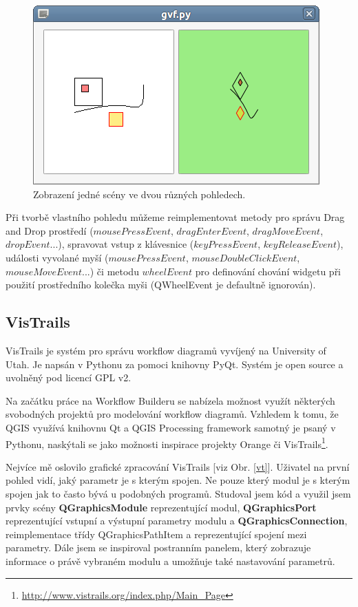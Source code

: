 \begin{figure}[h]
	\centering
	\includegraphics[scale=0.7]{pictures/qt/gsf}
	\caption{Zobrazení jedné scény ve dvou různých pohledech.}
	\label{gsf}
\end{figure}

Při tvorbě vlastního pohledu můžeme reimplementovat metody pro správu
Drag and Drop prostředí ($mousePressEvent$, $dragEnterEvent$,
$dragMoveEvent$, $dropEvent$...), spravovat vstup z klávesnice
($keyPressEvent$, $keyReleaseEvent$), události vyvolané myší
($mousePressEvent$, $mouseDoubleClickEvent$, $mouseMoveEvent$...) či
metodu $wheelEvent$ pro definování chování widgetu při použití
prostředního kolečka myši (QWheelEvent je defaultně ignorován).

\subsection{VisTrails}

VisTrails je systém pro správu workflow diagramů vyvíjený na
University of Utah. Je napsán v Pythonu za pomoci knihovny
PyQt. Systém je open source a uvolněný pod licencí GPL v2.

Na začátku práce na Workflow Builderu se nabízela možnost využít
některých svobodných projektů pro modelování workflow
diagramů. Vzhledem k tomu, že QGIS využívá knihovnu Qt a QGIS
Processing framework samotný je psaný v Pythonu, naskýtali se jako
možnosti inspirace projekty Orange či 
VisTrails\footnote{\url{http://www.vistrails.org/index.php/Main\_Page}}.

Nejvíce mě oslovilo grafické zpracování VisTrails [viz
Obr. \ref{vt}]. Uživatel na první pohled vidí, jaký parametr je s
kterým spojen. Ne pouze který modul je s kterým spojen jak to často
bývá u podobných programů. Studoval jsem kód a využil jsem prvky
scény \textbf{QGraphicsModule} reprezentující
modul, \textbf{QGraphicsPort} reprezentující vstupní a výstupní
parametry modulu a \textbf{QGraphicsConnection}, reimplementace třídy
QGraphicsPathItem a reprezentující spojení mezi parametry. Dále jsem
se inspiroval postranním panelem, který zobrazuje informace o právě
vybraném modulu a umožňuje také nastavování parametrů.

